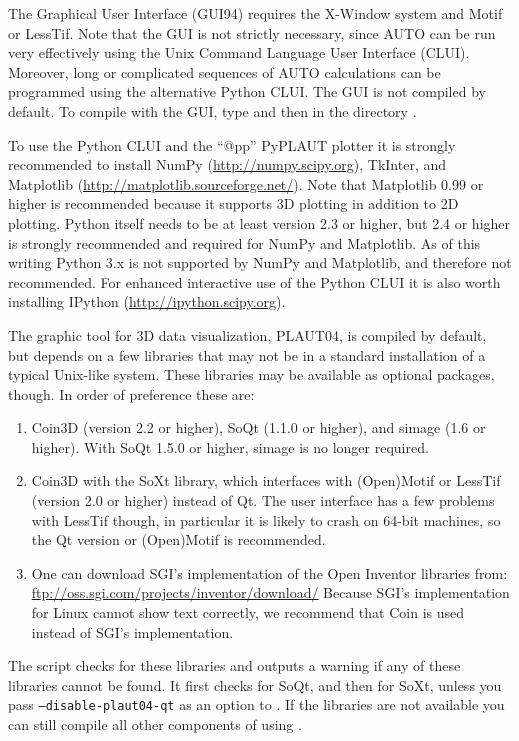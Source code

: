 \documentclass[12pt]{report}
\begin{document}
The Graphical User Interface (GUI94) requires the {\cal X-Window} system
and {\cal Motif} or {\cal LessTif}.
Note that the GUI is not strictly necessary, since {\cal AUTO} can be
run very effectively using the Unix Command Language User Interface (CLUI).
Moreover, long or complicated sequences of {\cal AUTO} calculations can
be programmed using the alternative Python CLUI. 
The GUI is not compiled by default. To compile
\AUTO with the GUI, type 
and then  in the directory .

To use the Python CLUI and the ``@pp'' {\cal PyPLAUT} plotter it
is strongly recommended to install NumPy
(\url{http://numpy.scipy.org}), TkInter, and
Matplotlib (\url{http://matplotlib.sourceforge.net/}).
Note that Matplotlib 0.99 or higher is recommended because it supports
3D plotting in addition to 2D plotting.
Python itself needs to be at least version 2.3 or higher, but 2.4 or
higher is strongly recommended and required for NumPy and Matplotlib.
As of this writing Python 3.x is not supported by NumPy and
Matplotlib, and therefore not recommended.
For enhanced interactive use of the Python CLUI it is also worth
installing IPython (\url{http://ipython.scipy.org}).

The graphic tool for 3D \AUTO data visualization, {\cal PLAUT04}, is
compiled by default, but depends on a few libraries that may not be
in a standard installation of a typical Unix-like
system. These libraries may be available as optional packages,
though. In order of preference these are:
\begin{enumerate}
\item
Coin3D (version 2.2 or higher), SoQt (1.1.0 or higher), and simage
(1.6 or higher). With SoQt 1.5.0 or higher, simage is no longer required.
\item
Coin3D with the SoXt library, which interfaces with (Open)Motif or
LessTif (version 2.0 or higher) instead of Qt. The user interface has
a few problems with LessTif though, in particular it is likely to
crash on 64-bit machines, so the Qt version or (Open)Motif is
recommended.
\item
One can download SGI's implementation of the
Open Inventor libraries from:
\url{ftp://oss.sgi.com/projects/inventor/download/}
Because SGI's implementation for Linux cannot show text correctly, 
we recommend that Coin is used instead of SGI's implementation. 
\end{enumerate}

The  script checks
for these libraries and outputs a warning if any of these libraries
cannot be found. It first checks for SoQt, and then for SoXt, unless
you pass \texttt{\hyphenchar{}\relax --disable-plaut04-qt}
as an option to .
If the libraries are not available you can still compile
all other components of \AUTO using .
\end{document}
